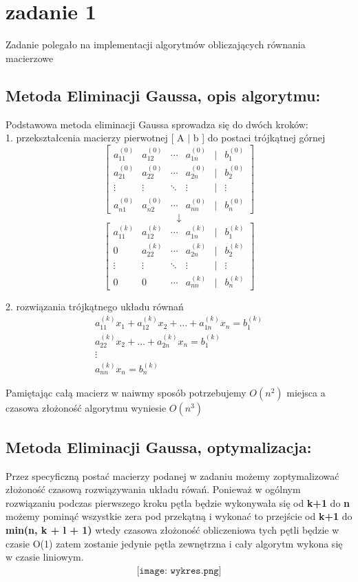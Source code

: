 \section{zadanie 1}
Zadanie polegało na implementacji algorytmów obliczających równania macierzowe

\subsection{Metoda Eliminacji Gaussa, opis algorytmu: }
Podstawowa metoda eliminacji Gaussa sprowadza się do dwóch kroków:\\
1. przekształcenia macierzy pierwotnej [ A \(\vert\) b ] do postaci trójkątnej górnej\\

\[
\begin{bmatrix}
  a_{11}^{(0)} & a_{12}^{(0)} & \cdots & a_{1n}^{(0)} & | & b_{1}^{(0)} \\
  a_{21}^{(0)} & a_{22}^{(0)} & \cdots & a_{2n}^{(0)} & | & b_{2}^{(0)}\\
  \vdots & \vdots & \ddots & \vdots & | & \vdots\\
  a_{n1}^{(0)} & a_{n2}^{(0)} & \cdots & a_{nn}^{(0)} & | & b_{n}^{(0)}
\end{bmatrix}
\]\[
\downarrow
\]\[
\begin{bmatrix}
  a_{11}^{(k)} & a_{12}^{(k)} & \cdots & a_{1n}^{(k)} & | & b_{1}^{(k)} \\
  0 & a_{22}^{(k)} & \cdots & a_{2n}^{(k)} & | & b_{2}^{(k)}\\
  \vdots & \vdots & \ddots & \vdots & | & \vdots\\
  0 & 0 & \cdots & a_{nn}^{(k)} & | & b_{n}^{(k)}
\end{bmatrix}
\]

2. rozwiązania trójkątnego układu równań
\begin{align*}
a_{11}^{(k)} x_1 + a_{12}^{(k)} x_2 + \ldots + a_{1n}^{(k)} x_n = b_{1}^{(k)}\\
a_{22}^{(k)} x_2 + \ldots + a_{2n}^{(k)} x_n = b_{1}^{(k)}\\
\vdots\\
a_{nn}^{(k)} x_n = b_{n}^{(k)}
\end{align*}

Pamiętając całą macierz w naiwmy sposób potrzebujemy \(O(n^2)\) miejsca a czasowa złożoność algorytmu wyniesie \(O(n^3)\)

\subsection{Metoda Eliminacji Gaussa, optymalizacja: }
Przez specyficzną postać macierzy podanej w zadaniu możemy zoptymalizować złożoność czasową rozwiązywania układu rówań. Ponieważ w ogólnym rozwiązaniu podczas pierwszego kroku pętla będzie wykonywała się od \textbf{k+1} do \textbf{n} możemy pominąć wszystkie zera pod przekątną i wykonać to przejście od \textbf{k+1} do \textbf{min(n, k + l + 1)} wtedy czasowa złożoność obliczeniowa tych pętli będzie w czasie O(1) zatem zostanie jedynie pętla zewnętrzna i cały algorytm wykona się w czasie liniowym.
\begin{align*}
\texttt{[image: wykres.png]}
\end{align*}

